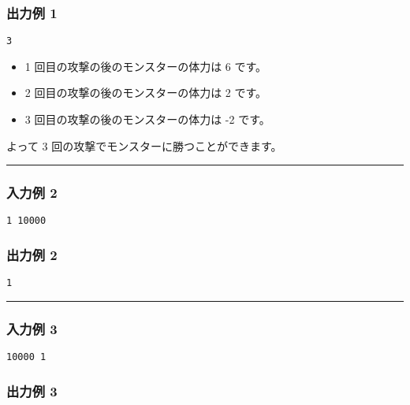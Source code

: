\subsubsection{出力例 1}

\begin{verbatim}
3
\end{verbatim}

\begin{itemize}
\tightlist
\item
  1 回目の攻撃の後のモンスターの体力は 6 です。
\item
  2 回目の攻撃の後のモンスターの体力は 2 です。
\item
  3 回目の攻撃の後のモンスターの体力は -2 です。
\end{itemize}

よって 3 回の攻撃でモンスターに勝つことができます。

\begin{center}\rule{0.5\linewidth}{\linethickness}\end{center}

\subsubsection{入力例 2}

\begin{verbatim}
1 10000
\end{verbatim}

\subsubsection{出力例 2}

\begin{verbatim}
1
\end{verbatim}

\begin{center}\rule{0.5\linewidth}{\linethickness}\end{center}

\subsubsection{入力例 3}

\begin{verbatim}
10000 1
\end{verbatim}

\subsubsection{出力例 3}

